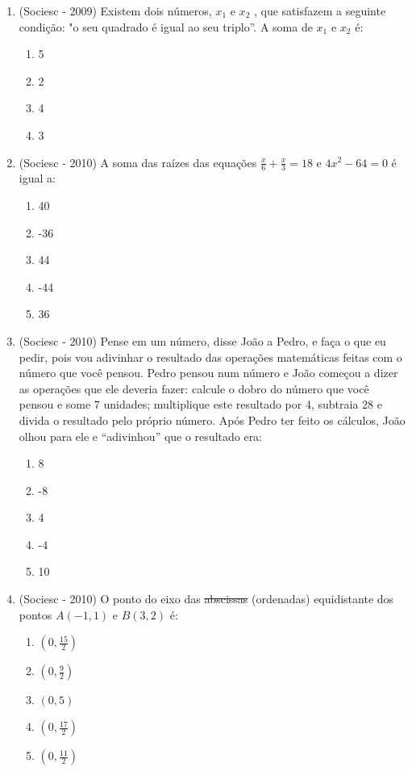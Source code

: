 \begin{enumerate}
 \item (Sociesc - 2009) Existem dois números, $x_1$ e $x_2$ , que satisfazem a seguinte condição: "o seu quadrado é igual ao seu triplo”. A soma de $x_1$ e $x_2$ é:
  \begin{enumerate}
  \item 5
  \item 2
  \item 4
  \item 3
 \end{enumerate}
 
 \item (Sociesc - 2010) A soma das raízes das equações $\frac{x}{6}+\frac{x}{3}=18$ e $4x^2-64=0$ é igual a:
  \begin{enumerate}
  \item 40
  \item -36
  \item 44
  \item -44
  \item 36
 \end{enumerate}
 
  \item (Sociesc - 2010) Pense em um número, disse João a Pedro, e faça o que eu pedir, pois vou adivinhar o resultado das operações matemáticas feitas com o número que você pensou. Pedro pensou num número e João começou a dizer as operações que ele deveria fazer: calcule o dobro do número que você pensou e some 7 unidades; multiplique este resultado por 4, subtraia 28 e divida o resultado pelo próprio número. Após Pedro ter feito os cálculos, João olhou para ele e “adivinhou” que o resultado era:
  \begin{enumerate}
  \item 8 
  \item -8
  \item 4
  \item -4
  \item 10
 \end{enumerate}
 
 \item (Sociesc - 2010) O ponto do eixo das \sout{abscissas} (ordenadas) equidistante dos pontos $A(-1, 1)$ e $B(3, 2)$ é:
  
 
 \begin{multicols}{2}
 
 \begin{enumerate}
  \item $(0, \frac{15}{2})$
  \item $(0, \frac{9}{2})$
  \item $(0,5)$
  \item $(0, \frac{17}{2})$
  \item $(0, \frac{11}{2})$
 \end{enumerate}
 

\end{multicols}
\end{enumerate}
